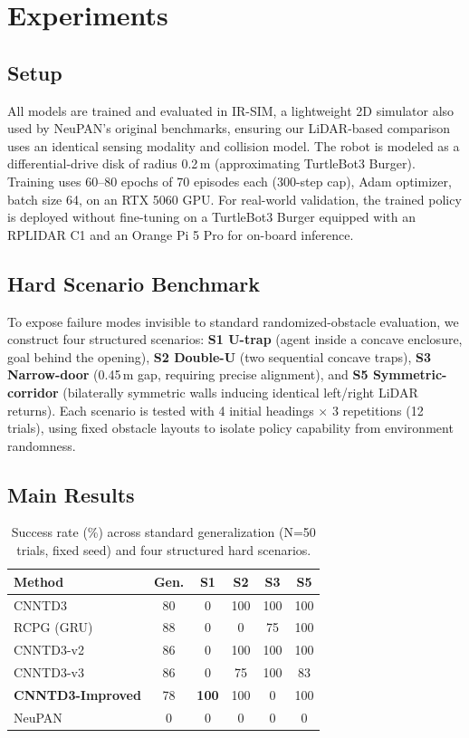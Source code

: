 \section{Experiments}
\label{sec:results}

\subsection{Setup}

All models are trained and evaluated in IR-SIM, a lightweight 2D
simulator also used by NeuPAN's original benchmarks, ensuring our
LiDAR-based comparison uses an identical sensing modality and
collision model. The robot is modeled as a differential-drive disk
of radius 0.2\,m (approximating TurtleBot3 Burger). Training uses
60--80 epochs of 70 episodes each (300-step cap), Adam optimizer,
batch size 64, on an RTX 5060 GPU. For real-world validation, the
trained policy is deployed without fine-tuning on a TurtleBot3 Burger
equipped with an RPLIDAR C1 and an Orange Pi 5 Pro for on-board
inference.

\subsection{Hard Scenario Benchmark}

To expose failure modes invisible to standard randomized-obstacle
evaluation, we construct four structured scenarios: \textbf{S1
U-trap} (agent inside a concave enclosure, goal behind the opening),
\textbf{S2 Double-U} (two sequential concave traps), \textbf{S3
Narrow-door} (0.45\,m gap, requiring precise alignment), and
\textbf{S5 Symmetric-corridor} (bilaterally symmetric walls inducing
identical left/right LiDAR returns). Each scenario is tested with 4
initial headings $\times$ 3 repetitions (12 trials), using fixed
obstacle layouts to isolate policy capability from environment
randomness.

\subsection{Main Results}

\begin{table}[t]
\centering
\caption{Success rate (\%) across standard generalization
(N=50 trials, fixed seed) and four structured hard scenarios.}
\label{tab:main}
\begin{tabular}{lccccc}
\toprule
Method & Gen. & S1 & S2 & S3 & S5 \\
\midrule
CNNTD3            & 80 & 0   & 100 & 100 & 100 \\
RCPG (GRU)        & 88 & 0   & 0   & 75  & 100 \\
CNNTD3-v2         & 86 & 0   & 100 & 100 & 100 \\
CNNTD3-v3         & 86 & 0   & 75  & 100 & 83  \\
\textbf{CNNTD3-Improved} & 78 & \textbf{100} & 100 & 0 & 100 \\
NeuPAN~\cite{han2025neupan} & 0  & 0   & 0   & 0   & 0   \\
\bottomrule
\end{tabular}
\end{table}

